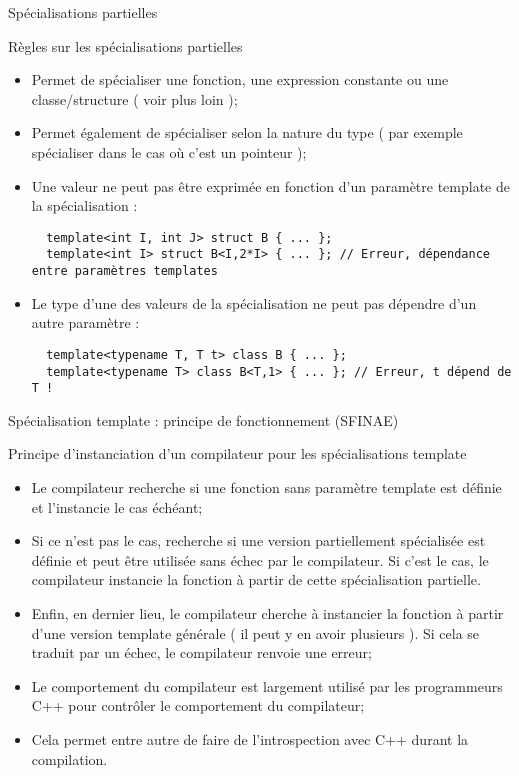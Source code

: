 \documentclass[compress,10pt,aspectratio=169]{beamer}
\begin{document}
\begin{frame}[fragile]{Spécialisations partielles}
  \begin{block}{\small Règles sur les spécialisations partielles}
  \begin{itemize}
  \item Permet de spécialiser une fonction, une expression constante ou une classe/structure ( voir plus loin );
  \item Permet également de spécialiser selon la nature du type ( par exemple spécialiser dans le cas où c'est un pointeur );
  \item Une valeur ne peut pas être exprimée en fonction d'un paramètre template de la spécialisation :
  \begin{verbatim}
  template<int I, int J> struct B { ... };
  template<int I> struct B<I,2*I> { ... }; // Erreur, dépendance entre paramètres templates
  \end{verbatim}
  \item Le type d'une des valeurs de la spécialisation ne peut pas dépendre d'un autre paramètre :
  \begin{verbatim}
  template<typename T, T t> class B { ... };
  template<typename T> class B<T,1> { ... }; // Erreur, t dépend de T !
  \end{verbatim}
  \end{itemize}
  \end{block}
\end{frame}

\begin{frame}[fragile]{Spécialisation template : principe de fonctionnement (SFINAE)}
  \scriptsize
  \begin{block}{\small Principe d'instanciation d'un compilateur pour les spécialisations template}
  \begin{itemize}
  \item Le compilateur recherche si une fonction sans paramètre template est définie et l'instancie le cas échéant;
  \item Si ce n'est pas le cas, recherche si une version partiellement spécialisée est définie et  peut être utilisée sans échec
  par le compilateur. Si c'est le cas, le compilateur instancie la fonction à partir de cette spécialisation partielle.
  \item Enfin, en dernier lieu, le compilateur cherche à instancier la fonction à partir d'une version template générale ( il peut
  y en avoir plusieurs ). Si cela se traduit par un échec, le compilateur renvoie une erreur;
  \item Le comportement du compilateur est largement utilisé par les programmeurs C++ pour contrôler le comportement du compilateur;
  \item Cela permet entre autre de faire de l'introspection avec C++ durant la compilation.
  \end{itemize}
  \end{block}
\end{frame}
\end{document}
